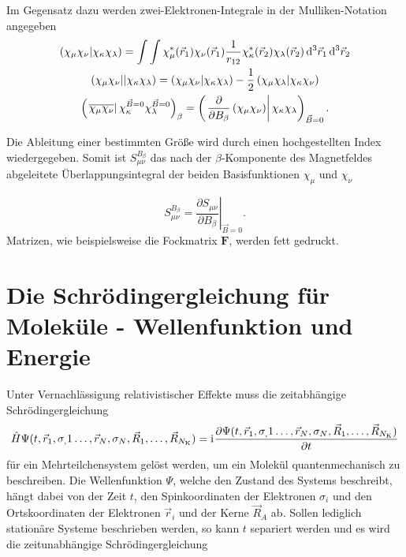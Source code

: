 Im Gegensatz dazu werden zwei-Elektronen-Integrale in der Mulliken-Notation angegeben
\begin{gather*}
	\left(\chi_\mu\chi_\nu\vert\chi_\kappa\chi_\lambda\right)=\int\int\chi_\mu^*(\vec{r}_1)\chi_\nu(\vec{r}_1)\frac{1}{r_{12}}\chi_\kappa^*(\vec{r}_2)\chi_\lambda(\vec{r}_2)\mathop{}\!\mathrm{d^3} \vec{r}_1 \mathop{}\!\mathrm{d^3} \vec{r}_2\\
    \left(\chi_\mu\chi_\nu\vert\vert\chi_\kappa\chi_\lambda\right)=\left(\chi_\mu\chi_\nu\vert\chi_\kappa\chi_\lambda\right)-\frac{1}{2}\left(\chi_\mu\chi_\lambda\vert\chi_\kappa\chi_\nu\right)\\
    \left(\left.\overline{\chi_\mu\chi_\nu}\right\vert\chi_\kappa^{\vec{B}=0 }\chi_\lambda^{\vec{B}=0}\right)_\beta=\left(\left.\frac{\partial}{\partial B_\beta}\left(\chi_\mu\chi_\nu\right)\right|\chi_\kappa\chi_\lambda\right)_{\vec{B} = 0}.
\end{gather*}

Die Ableitung einer bestimmten Größe wird durch einen hochgestellten Index wiedergegeben. Somit ist $S^{B_\beta}_{\mu\nu}$ das nach der $\beta$-Komponente des Magnetfeldes abgeleitete Überlappungsintegral der beiden Basisfunktionen $\chi_\mu$ und $\chi_\nu$

\begin{equation*}
  S^{B_\beta}_{\mu\nu}=\left.\frac{\partial S_{\mu\nu}}{\partial B_\beta}\right|_{\vec{B} = 0}.
\end{equation*} 
Matrizen, wie beispielsweise die Fockmatrix $\boldsymbol{F}$, werden fett gedruckt.
\section{Die Schrödingergleichung für Moleküle - Wellenfunktion und Energie}

Unter Vernachlässigung relativistischer Effekte muss die zeitabhängige Schrödingergleichung
\begin{equation}
  \hat{H}\Psi(t,\vec{r}_1,\sigma_,1\dotsc,\vec{r}_N,\sigma_N,\vec{R}_1,\dotsc,\vec{R}_{N_{\text{K}}})=\mathrm{i}\mkern1mu\frac{\partial\Psi(t,\vec{r}_1,\sigma_,1\dotsc,\vec{r}_N,\sigma_N,\vec{R}_1,\dotsc,\vec{R}_{N_{\text{K}}})}{\partial t}
\end{equation}
für ein Mehrteilchensystem gelöst werden, um ein Molekül quantenmechanisch zu beschreiben. Die Wellenfunktion $\Psi$, welche den Zustand des Systems beschreibt, hängt dabei von der Zeit $t$, den Spinkoordinaten der Elektronen $\sigma_i$ und den Ortskoordinaten der Elektronen $\vec{r}_i$ und der Kerne $\vec{R}_A$ ab. Sollen lediglich stationäre Systeme beschrieben werden, so kann $t$ separiert werden und es wird die zeitunabhängige Schrödingergleichung 

